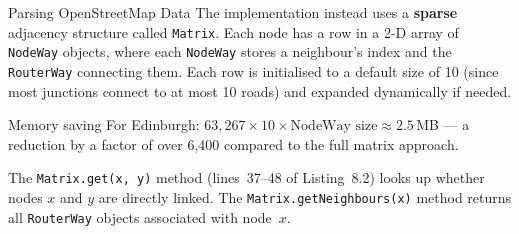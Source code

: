 \documentclass[aspectratio=169,10pt]{beamer}
\begin{document}
\begin{frame}[allowframebreaks]{Parsing OpenStreetMap Data}
  \medskip
  The implementation instead uses a \textbf{sparse} adjacency structure
  called \texttt{Matrix}.  Each node has a row in a 2-D array of
  \texttt{NodeWay} objects, where each \texttt{NodeWay} stores a
  neighbour's index and the \texttt{RouterWay} connecting them.  Each row
  is initialised to a default size of 10 (since most junctions connect
  to at most 10 roads) and expanded dynamically if needed.

  \begin{exampleblock}{Memory saving}
    For Edinburgh: $63,\!267 \times 10 \times \text{NodeWay size}
    \approx 2.5$\,MB --- a reduction by a factor of over 6,400 compared
    to the full matrix approach.
  \end{exampleblock}

  \medskip
  The \texttt{Matrix.get(x, y)} method (lines~37--48 of Listing~8.2)
  looks up whether nodes $x$ and $y$ are directly linked.  The
  \texttt{Matrix.getNeighbours(x)} method returns all \texttt{RouterWay}
  objects associated with node~$x$.
\end{frame}
\end{document}
